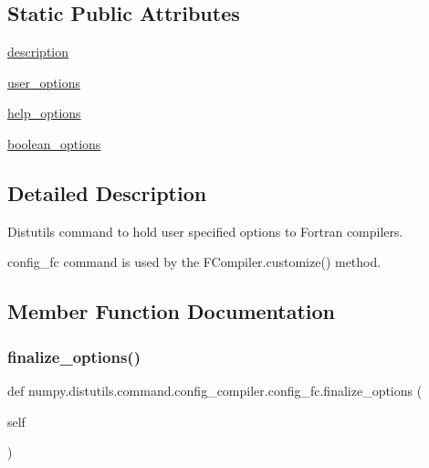 \subsection*{Static Public Attributes}
\begin{DoxyCompactItemize}
\item 
\hyperlink{classnumpy_1_1distutils_1_1command_1_1config__compiler_1_1config__fc_a1c47d8ff8b435c48b2a7f3456b68306d}{description}
\item 
\hyperlink{classnumpy_1_1distutils_1_1command_1_1config__compiler_1_1config__fc_a5e10c0bf4e3cef7231dd5bf24b89ab65}{user\+\_\+options}
\item 
\hyperlink{classnumpy_1_1distutils_1_1command_1_1config__compiler_1_1config__fc_ab60c12e68837a2b2b5da497f0ea3427e}{help\+\_\+options}
\item 
\hyperlink{classnumpy_1_1distutils_1_1command_1_1config__compiler_1_1config__fc_a0ea840728d97807d19268097739d96cb}{boolean\+\_\+options}
\end{DoxyCompactItemize}


\subsection{Detailed Description}
\begin{DoxyVerb}Distutils command to hold user specified options
to Fortran compilers.

config_fc command is used by the FCompiler.customize() method.
\end{DoxyVerb}
 

\subsection{Member Function Documentation}
\mbox{\label{classnumpy_1_1distutils_1_1command_1_1config__compiler_1_1config__fc_aab6527090fbbf5c72ead1233775c75af}} 
\subsubsection{\texorpdfstring{finalize\+\_\+options()}{finalize\_options()}}
{\footnotesize\ttfamily def numpy.\+distutils.\+command.\+config\+\_\+compiler.\+config\+\_\+fc.\+finalize\+\_\+options (\begin{DoxyParamCaption}\item[{}]{self }\end{DoxyParamCaption})}

